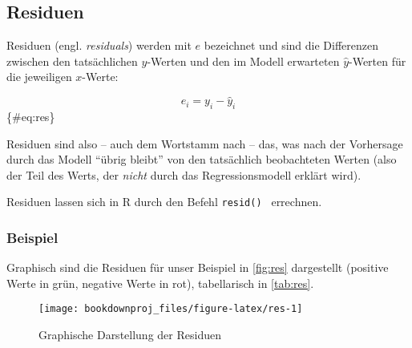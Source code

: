 \documentclass[
  ngerman,
]{article}
\begin{document}
\hypertarget{residuen}{%
\subsection{Residuen}\label{residuen}}

Residuen (engl. \emph{residuals}) werden mit \(e\) bezeichnet und sind die Differenzen zwischen den tatsächlichen \(y\)-Werten und den im Modell erwarteten \(\hat{y}\)-Werten für die jeweiligen \(x\)-Werte:

\nopagebreak

\[
e_i=y_i-\hat{y}_i
\]\{\#eq:res\}

Residuen sind also -- auch dem Wortstamm nach -- das, was nach der Vorhersage durch das Modell ``übrig bleibt'' von den tatsächlich beobachteten Werten (also der Teil des Werts, der \emph{nicht} durch das Regressionsmodell erklärt wird).

\begin{rtip}
Residuen lassen sich in R durch den Befehl {\tt resid() } errechnen.
\end{rtip}

\hypertarget{beispiel-27}{%
\subsubsection{Beispiel}\label{beispiel-27}}

Graphisch sind die Residuen für unser Beispiel in \autoref{fig:res} dargestellt (positive Werte in grün, negative Werte in rot), tabellarisch in \autoref{tab:res}.

\begin{figure}[h]

{\centering \texttt{[image: bookdownproj\_files/figure-latex/res-1]} 

}

\caption{Graphische Darstellung der Residuen}\label{fig:res}
\end{figure}
\end{document}
